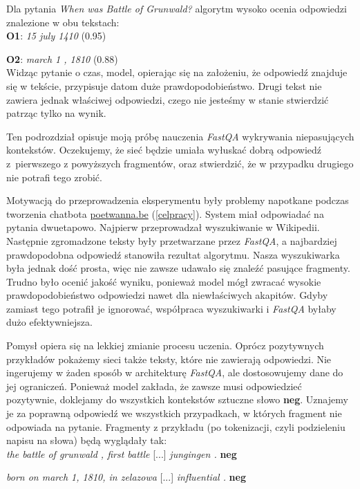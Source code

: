 \normalsize
Dla pytania \textit{When was Battle of Grunwald?} algorytm wysoko ocenia odpowiedzi znalezione w obu tekstach:\\

\small
\textbf{O1}: \textit{15 july 1410} (0.95)

\textbf{O2}: \textit{march 1 , 1810} (0.88)\\

\normalsize
Widząc pytanie o czas, model, opierając się na założeniu, że odpowiedź znajduje się w tekście, przypisuje datom duże prawdopodobieństwo. Drugi tekst nie zawiera jednak właściwej odpowiedzi, czego nie jesteśmy w stanie stwierdzić patrząc tylko na wynik.

Ten podrozdział opisuje moją próbę nauczenia \textit{FastQA} wykrywania niepasujących kontekstów. Oczekujemy, że sieć będzie umiała wyłuskać dobrą odpowiedź z~pierwszego z powyższych fragmentów, oraz stwierdzić, że w przypadku drugiego nie potrafi tego zrobić.

Motywacją do przeprowadzenia eksperymentu były problemy napotkane podczas tworzenia chatbota \url{poetwanna.be} (\ref{celpracy}). System miał odpowiadać na pytania dwuetapowo. Najpierw przeprowadzał wyszukiwanie w Wikipedii. Następnie zgromadzone teksty były przetwarzane przez \textit{FastQA}, a najbardziej prawdopodobna odpowiedź stanowiła rezultat algorytmu. Nasza wyszukiwarka była jednak dość prosta, więc nie zawsze udawało się znaleźć pasujące fragmenty. Trudno było ocenić jakość wyniku, ponieważ model mógł zwracać wysokie prawdopodobieństwo odpowiedzi nawet dla niewłaściwych akapitów. Gdyby zamiast tego potrafił je ignorować, współpraca wyszukiwarki i \textit{FastQA} byłaby dużo efektywniejsza.

Pomysł opiera się na lekkiej zmianie procesu uczenia. Oprócz pozytywnych przykładów pokażemy sieci także teksty, które nie zawierają odpowiedzi. Nie ingerujemy w żaden sposób w architekturę \textit{FastQA}, ale dostosowujemy dane do jej ograniczeń. Ponieważ model zakłada, że zawsze musi odpowiedzieć pozytywnie, doklejamy do wszystkich kontekstów sztuczne słowo \textbf{neg}. Uznajemy je za poprawną odpowiedź we wszystkich przypadkach, w których fragment nie odpowiada na pytanie. Fragmenty z przykładu (po tokenizacji, czyli podzieleniu napisu na słowa) będą wyglądały tak:\\

\small
\textit{the battle of grunwald , first battle} [...] \textit{jungingen .} \textbf{neg}

\textit{born on march 1, 1810, in zelazowa} [...] \textit{influential .} \textbf{neg}\\

